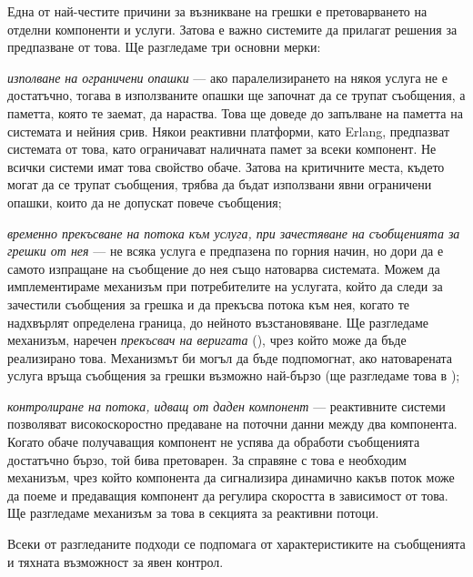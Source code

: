 Една от най-честите причини за възникване на грешки е претоварването на отделни компоненти и услуги. Затова е важно системите да прилагат решения за предпазване от това. Ще разгледаме три основни мерки:

\begin{itemize*}
  \item \emph{изполване на ограничени опашки} — ако паралелизирането на някоя услуга не е достатъчно, тогава в използваните опашки ще започнат да се трупат съобщения, а паметта, която те заемат, да нараства. Това ще доведе до запълване на паметта на системата и нейния срив. Някои реактивни платформи, като Erlang, предпазват системата от това, като ограничават наличната памет за всеки компонент. Не всички системи имат това свойство обаче. Затова на критичните места, където могат да се трупат съобщения, трябва да бъдат използвани явни ограничени опашки, които да не допускат повече съобщения;
  \item \emph{временно прекъсване на потока към услуга, при зачестяване на съобщенията за грешки от нея} — не всяка услуга е предпазена по горния начин, но дори да е самото изпращане на съобщение до нея също натоварва системата. Можем да имплементираме механизъм при потребителите на услугата, който да следи за зачестили съобщения за грешка и да прекъсва потока към нея, когато те надхвърлят определена граница, до нейното възстановяване. Ще разгледаме механизъм, наречен \emph{прекъсвач на веригата} (), чрез който може да бъде реализирано това. Механизмът би могъл да бъде подпомогнат, ако натоварената услуга връща съобщения за грешки възможно най-бързо (ще разгледаме това в );
  \item \emph{контролиране на потока, идващ от даден компонент} — реактивните системи позволяват високоскоростно предаване на поточни данни между два компонента. Когато обаче получаващия компонент не успява да обработи съобщенията достатъчно бързо, той бива претоварен. За справяне с това е необходим механизъм, чрез който компонента да сигнализира динамично какъв поток може да поеме и предаващия компонент да регулира скоростта в зависимост от това. Ще разгледаме механизъм за това в секцията за реактивни потоци.
\end{itemize*}

Всеки от разгледаните подходи се подпомага от характеристиките на съобщенията и тяхната възможност за явен контрол.

